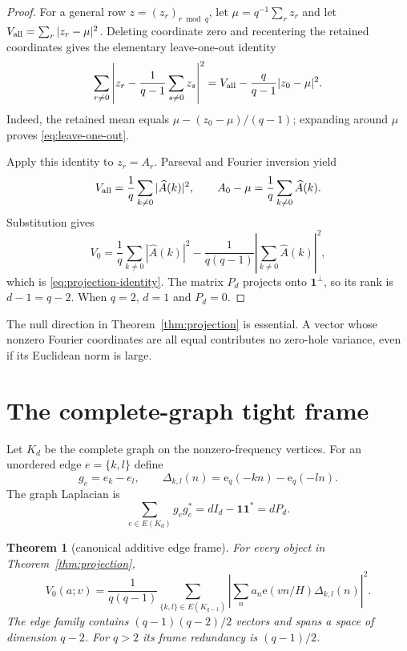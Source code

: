 \documentclass[11pt]{article}
\newtheorem{theorem}{Theorem}[section]
\newcommand{\e}{\mathrm e}
\newcommand{\one}{\mathbf 1}
\begin{document}
\begin{proof}
For a general row $z=(z_r)_{r\bmod q}$, let
$\mu=q^{-1}\sum_rz_r$ and let $V_{\rm all}=\sum_r|z_r-\mu|^2$.
Deleting coordinate zero and recentering the retained coordinates gives the
elementary leave-one-out identity
\begin{equation}\label{eq:leave-one-out}
 \sum_{r\ne0}\left|z_r-\frac1{q-1}\sum_{s\ne0}z_s\right|^2
 =V_{\rm all}-\frac q{q-1}|z_0-\mu|^2.
\end{equation}
Indeed, the retained mean equals
$\mu-(z_0-\mu)/(q-1)$; expanding around $\mu$ proves
\eqref{eq:leave-one-out}.

Apply this identity to $z_r=A_r$.  Parseval and Fourier inversion yield
\begin{equation}\label{eq:parseval-inversion}
 V_{\rm all}=\frac1q\sum_{k\ne0}|\widehat A(k)|^2,
 \qquad
 A_0-\mu=\frac1q\sum_{k\ne0}\widehat A(k).
\end{equation}
Substitution gives
\begin{equation}\label{eq:projection-expanded}
 V_0=\frac1q\sum_{k\ne0}|\widehat A(k)|^2
 -\frac1{q(q-1)}\left|\sum_{k\ne0}\widehat A(k)\right|^2,
\end{equation}
which is \eqref{eq:projection-identity}.  The matrix $P_d$ projects onto
$\one^\perp$, so its rank is $d-1=q-2$.  When $q=2$, $d=1$ and $P_d=0$.
\end{proof}

The null direction in Theorem~\ref{thm:projection} is essential.  A vector
whose nonzero Fourier coordinates are all equal contributes no zero-hole
variance, even if its Euclidean norm is large.

\section{The complete-graph tight frame}

Let $K_d$ be the complete graph on the nonzero-frequency vertices.  For an
unordered edge $e=\{k,l\}$ define
\begin{equation}\label{eq:edge-vector}
 g_e=e_k-e_l,
 \qquad
 \Delta_{k,l}(n)=\e_q(-kn)-\e_q(-ln).
\end{equation}
The graph Laplacian is
\begin{equation}\label{eq:laplacian}
 \sum_{e\in E(K_d)}g_eg_e^*=dI_d-\one\one^*=dP_d.
\end{equation}

\begin{theorem}[canonical additive edge frame]\label{thm:edge-frame}
For every object in Theorem~\ref{thm:projection},
\begin{equation}\label{eq:edge-frame}
 \boxed{
 V_0(a;v)=\frac1{q(q-1)}
 \sum_{\{k,l\}\in E(K_{q-1})}
 \left|\sum_n a_n\e(vn/H)\Delta_{k,l}(n)\right|^2.}
\end{equation}
The edge family contains $(q-1)(q-2)/2$ vectors and spans a space of
dimension $q-2$.  For $q>2$ its frame redundancy is $(q-1)/2$.
\end{theorem}
\end{document}
